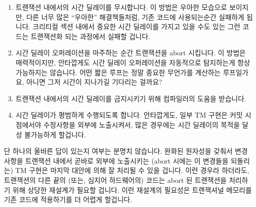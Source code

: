 \begin{enumerate}
\item	트랜잭션 내에서의 시간 딜레이를 무시합니다.
	이 방법은 우아한 모습으로 보이지만, 다른 너무 많은 ``우아한''
	해결책들처럼, 기존 코드에 사용되는순간 실패하게 됩니다.
	크리티컬 섹션 내에서 중요한 시간 딜레이를 가지고 있을 수도 있는 그런
	코드는 트랜잭션화 되는 과정에서 실패할 겁니다.
\item	시간 딜레이 오퍼레이션을 마주하는 순간 트랜잭션을 abort 시킵니다.
	이 방법은 매력적이지만, 안타깝게도 시간 딜레이 오퍼레이션을 자동적으로
	탐지하는게 항상 가능하지는 않습니다.
	어떤 짧은 루프는 정말 중요한 무언가를 계산하는 루프일가요, 아니면 그저
	시간이 지나가길 기다리는 걸까요?
\item	트랜잭션 내에서의 시간 딜레이를 금지시키기 위해 컴파일러의 도움을
	받습니다.
\item	시간 딜레이가 평범하게 수행되도록 합니다.
	안타깝게도, 일부 TM 구현은 커밋 시점에서야 수정사항을 외부에
	노출시켜서, 많은 경우에는 시간 딜레이의 목적을 달성 불가능하게
	할겁니다.

\end{enumerate}

단 하나의 올바른 답이 있는지 여부는 분명치 않습니다.
완화된 원자성을 갖춰서 변경 사항을 트랜잭션 내에서 곧바로 외부에 노출시키는
(abort 시에는 이 변경들을 되돌리는) TM 구현은 마지막 대안에 의해 잘 처리될 수
있을 겁니다.
이런 경우라 하더라도, 트랜잭션의 다른 끝의 (또는, 심지어 하드웨어의) 코드는
abort 된 트랜잭션을 처리하기 위해 상당한 재설계가 필요할 겁니다.
이런 재설계의 필요성은 트랜잭셔널 메모리를 기존 코드에 적용하기를 더 어렵게
할겁니다.
\iffalse

